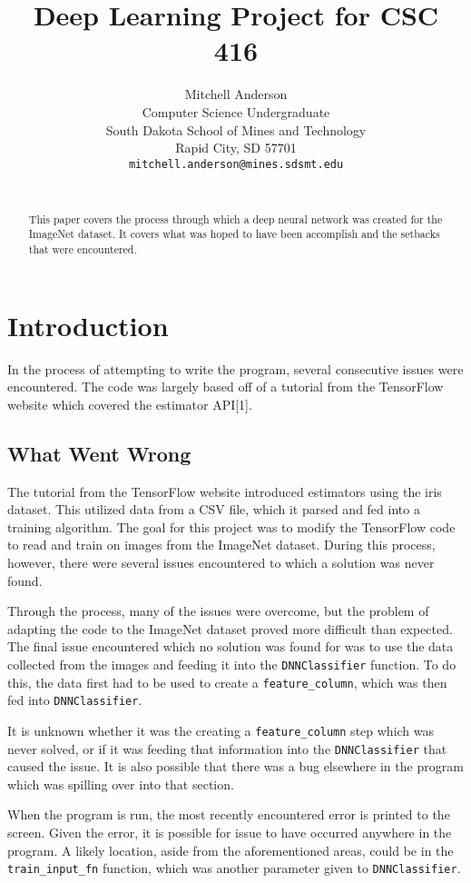 \documentclass{article}
\title{Deep Learning Project for CSC 416}
\author{
  Mitchell Anderson \\
  Computer Science Undergraduate \\
  South Dakota School of Mines and Technology\\
  Rapid City, SD 57701 \\
  \texttt{mitchell.anderson@mines.sdsmt.edu} \\\
}
\begin{document}
\maketitle

\begin{abstract}
  This paper covers the process through which a deep 
  neural network was created for the ImageNet dataset. It
  covers what was hoped to have been accomplish and the setbacks
  that were encountered.
\end{abstract}

\section{Introduction}

In the process of attempting to write the program, several consecutive
issues were encountered. The code was largely based off of a tutorial
from the TensorFlow website which covered the estimator API[1].

\subsection{What Went Wrong}

The tutorial from the TensorFlow website introduced estimators using
the iris dataset. This utilized data from a CSV file, which it parsed
and fed into a training algorithm. The goal for this project was to
modify the TensorFlow code to read and train on images from the ImageNet
dataset. During this process, however, there were several issues encountered
to which a solution was never found.

Through the process, many of the issues were overcome, but the problem
of adapting the code to the ImageNet dataset proved more difficult than
expected. The final issue encountered which no solution was found for
was to use the data collected from the images and feeding it into the
\texttt{DNNClassifier} function. To do this, the data first had to be used to
create a \texttt{feature\_column}, which was then fed into \texttt{DNNClassifier}.

It is unknown whether it was the creating a \texttt{feature\_column} step which
was never solved, or if it was feeding that information into the
\texttt{DNNClassifier} that caused the issue. It is also possible that there
was a bug elsewhere in the program which was spilling over into that
section.

When the program is run, the most recently encountered error is printed
to the screen. Given the error, it is possible for issue to have occurred
anywhere in the program. A likely location, aside from the aforementioned
areas, could be in the \texttt{train\_input\_fn} function, which was another parameter
given to \texttt{DNNClassifier}.
\end{document}
